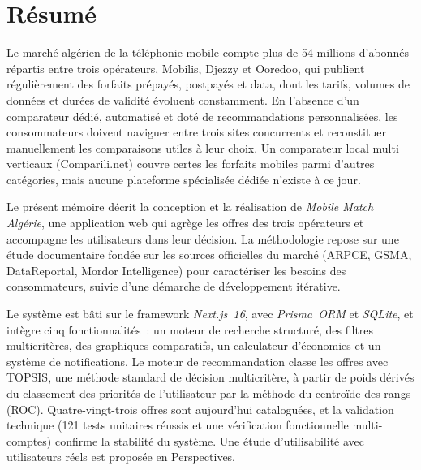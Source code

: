 
{}
\chapter*{Résumé}

Le marché algérien de la téléphonie mobile compte plus de 54 millions d'abonnés répartis entre trois opérateurs, Mobilis, Djezzy et Ooredoo, qui publient régulièrement des forfaits prépayés, postpayés et data, dont les tarifs, volumes de données et durées de validité évoluent constamment. En l'absence d'un comparateur dédié, automatisé et doté de recommandations personnalisées, les consommateurs doivent naviguer entre trois sites concurrents et reconstituer manuellement les comparaisons utiles à leur choix. Un comparateur local multi verticaux (Comparili.net) couvre certes les forfaits mobiles parmi d'autres catégories, mais aucune plateforme spécialisée dédiée n'existe à ce jour.

Le présent mémoire décrit la conception et la réalisation de \textit{Mobile Match Algérie}, une application web qui agrège les offres des trois opérateurs et accompagne les utilisateurs dans leur décision. La méthodologie repose sur une étude documentaire fondée sur les sources officielles du marché (ARPCE, GSMA, DataReportal, Mordor Intelligence) pour caractériser les besoins des consommateurs, suivie d'une démarche de développement itérative.

Le système est bâti sur le framework \textit{Next.js~16}, avec \textit{Prisma~ORM} et \textit{SQLite}, et intègre cinq fonctionnalités~: un moteur de recherche structuré, des filtres multicritères, des graphiques comparatifs, un calculateur d'économies et un système de notifications. Le moteur de recommandation classe les offres avec TOPSIS, une méthode standard de décision multicritère, à partir de poids dérivés du classement des priorités de l'utilisateur par la méthode du centroïde des rangs (ROC). Quatre-vingt-trois offres sont aujourd'hui catalogu\'ees, et la validation technique (121 tests unitaires réussis et une vérification fonctionnelle multi-comptes) confirme la stabilité du système. Une étude d'utilisabilité avec utilisateurs réels est proposée en Perspectives.


